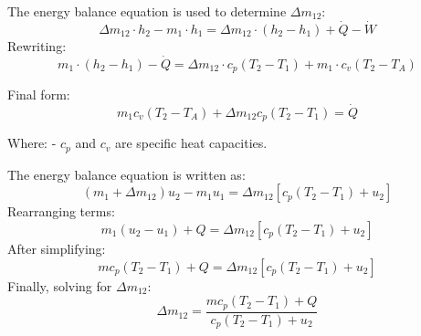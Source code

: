 The energy balance equation is used to determine \( \Delta m_{12} \):  
\[
\Delta m_{12} \cdot h_2 - m_1 \cdot h_1 = \Delta m_{12} \cdot (h_2 - h_1) + \dot{Q} - \dot{W}
\]  
Rewriting:  
\[
m_1 \cdot (h_2 - h_1) - \dot{Q} = \Delta m_{12} \cdot c_p (T_2 - T_1) + m_1 \cdot c_v (T_2 - T_A)
\]  

Final form:  
\[
m_1 c_v (T_2 - T_A) + \Delta m_{12} c_p (T_2 - T_1) = \dot{Q}
\]  

Where:  
- \( c_p \) and \( c_v \) are specific heat capacities.

The energy balance equation is written as:  
\[
(m_1 + \Delta m_{12}) u_2 - m_1 u_1 = \Delta m_{12} \left[ c_p (T_2 - T_1) + u_2 \right]
\]  
Rearranging terms:  
\[
m_1 (u_2 - u_1) + Q = \Delta m_{12} \left[ c_p (T_2 - T_1) + u_2 \right]
\]  
After simplifying:  
\[
m c_p (T_2 - T_1) + Q = \Delta m_{12} \left[ c_p (T_2 - T_1) + u_2 \right]
\]  
Finally, solving for \( \Delta m_{12} \):  
\[
\Delta m_{12} = \frac{m c_p (T_2 - T_1) + Q}{c_p (T_2 - T_1) + u_2}
\]